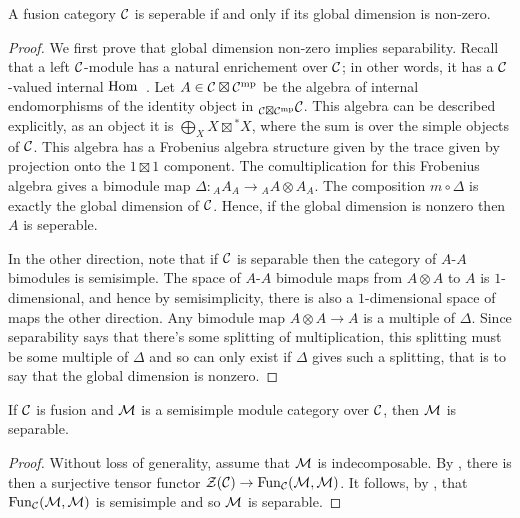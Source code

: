 \documentclass{amsart}
\begin{document}
\begin{theorem} \label{thm:NonzeroDimension}
A fusion category $\mathcal C$ is seperable if and only if its global dimension is non-zero.
\end{theorem}
\begin{proof}
We first prove that global dimension non-zero implies separability.  Recall that a left $\mathcal C$-module has a natural enrichement over $\mathcal C$; in other words, it has a $\mathcal C$-valued internal $\operatorname{Hom}$~\cite{Ostrik03}.  Let $A \in \mathcal C \boxtimes \mathcal C^{\mathrm{mp}}$ be the algebra of internal endomorphisms of the identity object in ${}_{\mathcal C \boxtimes \mathcal C^{\mathrm{mp}}} \mathcal C$.  This algebra can be described explicitly, as an object it is $\bigoplus_X X \boxtimes {}^*X$, where the sum is over the simple objects of $\mathcal C$.  This algebra has a Frobenius algebra structure given by the trace given by projection onto the $1 \boxtimes 1$ component.  The comultiplication for this Frobenius algebra gives a bimodule map $\Delta: {}_A A_A \rightarrow {}_A A \otimes A_A$.  The composition $m \circ \Delta$ is exactly the global dimension of $\mathcal C$.  Hence, if the global dimension is nonzero then $A$ is seperable.


In the other direction, note that if $\mathcal C$ is separable then the category of $A$-$A$ bimodules is semisimple.  The space of $A$-$A$ bimodule maps from $A \otimes A$ to $A$  is $1$-dimensional, and hence by semisimplicity, there is also a $1$-dimensional space of maps the other direction.  Any bimodule map $A \otimes A \rightarrow A$ is a multiple of $\Delta$.  Since separability says that there's some splitting of multiplication, this splitting must be some multiple of $\Delta$ and so can only exist if $\Delta$ gives such a splitting, that is to say that the global dimension is nonzero.
\end{proof}



\begin{theorem} \label{thm:SSModuleCatsAreSep}
If $\mathcal C$ is fusion and $\mathcal M$ is a semisimple module category over $\mathcal C$, then $\mathcal M$ is separable.
\end{theorem}
\begin{proof}
Without loss of generality, assume that $\mathcal M$ is indecomposable.  By \cite{???}, there is then a surjective tensor functor $\mathcal Z(\mathcal C) \rightarrow \operatorname{Fun}_\mathcal C(\mathcal M, \mathcal M)$.  It follows, by \cite{???}, that $\operatorname{Fun}_\mathcal C(\mathcal M, \mathcal M)$ is semisimple and so $\mathcal M$ is separable.
\end{proof}
\end{document}
